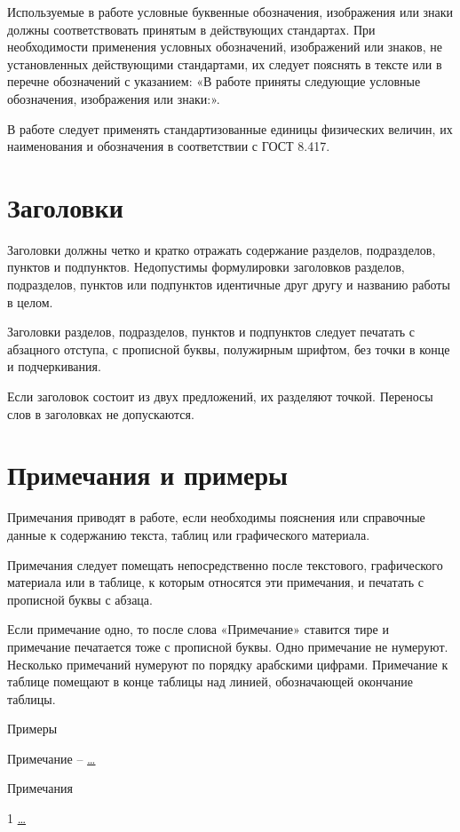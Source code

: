 \documentclass[14pt]{extreport}
\begin{document}
Используемые в работе условные буквенные обозначения, изображения или
знаки должны соответствовать принятым в действующих стандартах.
При необходимости применения условных обозначений, изображений или знаков, не
установленных действующими стандартами, их следует пояснять в тексте или в
перечне обозначений с указанием: «В работе приняты следующие условные
обозначения, изображения или знаки:».

В работе следует применять стандартизованные единицы физических величин,
их наименования и обозначения в соответствии с ГОСТ 8.417.

\section{Заголовки}

Заголовки должны четко и кратко отражать содержание разделов, подразделов,
пунктов и подпунктов.
Недопустимы формулировки заголовков разделов, подразделов, пунктов или
подпунктов идентичные друг другу и названию работы в целом.

Заголовки разделов, подразделов, пунктов и подпунктов следует печатать с
абзацного отступа, с прописной буквы, полужирным шрифтом, без точки в конце и
подчеркивания. 

Если заголовок состоит из двух предложений, их разделяют точкой. Переносы слов
в заголовках не допускаются.

\section{Примечания и примеры}

Примечания приводят в работе, если необходимы пояснения или справочные
данные к содержанию текста, таблиц или графического материала.

Примечания следует помещать непосредственно после текстового, графического
материала или в таблице, к которым относятся эти примечания, и печатать с
прописной буквы с абзаца. 

Если примечание одно, то после слова «Примечание» ставится тире и примечание
печатается тоже с прописной буквы. Одно примечание не нумеруют. Несколько
примечаний нумеруют по порядку арабскими цифрами. Примечание к таблице помещают
в конце таблицы над линией, обозначающей окончание таблицы.

Примеры

Примечание – \underline{\ldots}

Примечания

1 \underline{\ldots}
\end{document}
